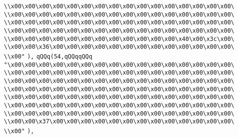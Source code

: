 \verb|\\x00\x00\x00\x00\x00\x00\x00\x00\x00\x00\x00\x00\x00\x00\x00\x00\|\newline
\verb|\\x00\x00\x00\x00\x00\x00\x00\x00\x00\x00\x00\x00\x00\x00\x00\x00\|\newline
\verb|\\x00\x00\x00\x00\x00\x00\x00\x00\x00\x00\x00\x00\x00\x00\x00\x00\|\newline
\verb|\\x00\x00\x00\x00\x00\x00\x00\x00\x00\x00\x00\x00\x00\x00\x00\x00\|\newline
\verb|\\x00\x00\x00\x00\x00\x00\x00\x00\x00\x00\x00\x00\x40\x00\x3c\x00\|\newline
\verb|\\x00\x00\x36\x00\x00\x00\x00\x00\x00\x00\x00\x00\x00\x00\x00\x00\|\newline
\verb|\\x00"|\newline
\verb|),|\newline
\verb|qQQq(54,qQQqqQQq|\newline
\verb|"\x00\x00\x00\x00\x00\x00\x00\x00\x00\x00\x00\x00\x00\x00\x00\x00\|\newline
\verb|\\x00\x00\x00\x00\x00\x00\x00\x00\x00\x00\x00\x00\x00\x00\x00\x00\|\newline
\verb|\\x00\x00\x00\x00\x00\x00\x00\x00\x00\x00\x00\x00\x00\x00\x00\x00\|\newline
\verb|\\x00\x00\x00\x00\x00\x00\x00\x00\x00\x00\x00\x00\x00\x00\x00\x00\|\newline
\verb|\\x00\x00\x00\x00\x00\x00\x00\x00\x00\x00\x00\x00\x00\x00\x00\x00\|\newline
\verb|\\x00\x00\x00\x00\x00\x00\x00\x00\x00\x00\x00\x00\x00\x00\x00\x00\|\newline
\verb|\\x00\x00\x00\x00\x00\x00\x00\x00\x00\x00\x00\x00\x00\x00\x00\x00\|\newline
\verb|\\x00\x00\x37\x00\x00\x00\x00\x00\x00\x00\x00\x00\x00\x00\x00\x00\|\newline
\verb|\\x00"|\newline
\verb|),|\newline
